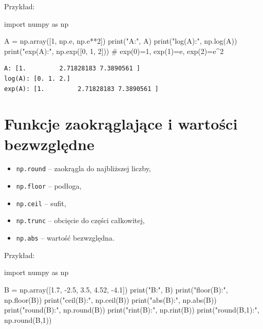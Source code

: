 \documentclass[
  polish,
  letterpaper,
  DIV=11,
  numbers=noendperiod]{scrreprt}
\newenvironment{Shaded}{\begin{snugshade}}{\end{snugshade}}
\newcommand{\BuiltInTok}[1]{\textcolor[rgb]{0.00,0.23,0.31}{#1}}
\newcommand{\CommentTok}[1]{\textcolor[rgb]{0.37,0.37,0.37}{#1}}
\newcommand{\DecValTok}[1]{\textcolor[rgb]{0.68,0.00,0.00}{#1}}
\newcommand{\FloatTok}[1]{\textcolor[rgb]{0.68,0.00,0.00}{#1}}
\newcommand{\ImportTok}[1]{\textcolor[rgb]{0.00,0.46,0.62}{#1}}
\newcommand{\NormalTok}[1]{\textcolor[rgb]{0.00,0.23,0.31}{#1}}
\newcommand{\OperatorTok}[1]{\textcolor[rgb]{0.37,0.37,0.37}{#1}}
\newcommand{\StringTok}[1]{\textcolor[rgb]{0.13,0.47,0.30}{#1}}
\providecommand{\tightlist}{%
  \setlength{\itemsep}{0pt}\setlength{\parskip}{0pt}}
\begin{document}
Przykład:

\begin{Shaded}
\begin{Highlighting}[]
\ImportTok{import}\NormalTok{ numpy }\ImportTok{as}\NormalTok{ np}

\NormalTok{A }\OperatorTok{=}\NormalTok{ np.array([}\DecValTok{1}\NormalTok{, np.e, np.e}\OperatorTok{**}\DecValTok{2}\NormalTok{])}
\BuiltInTok{print}\NormalTok{(}\StringTok{"A:"}\NormalTok{, A)}
\BuiltInTok{print}\NormalTok{(}\StringTok{"log(A):"}\NormalTok{, np.log(A))}
\BuiltInTok{print}\NormalTok{(}\StringTok{"exp(A):"}\NormalTok{, np.exp([}\DecValTok{0}\NormalTok{, }\DecValTok{1}\NormalTok{, }\DecValTok{2}\NormalTok{]))  }\CommentTok{\# exp(0)=1, exp(1)=e, exp(2)=e\^{}2}
\end{Highlighting}
\end{Shaded}

\begin{verbatim}
A: [1.         2.71828183 7.3890561 ]
log(A): [0. 1. 2.]
exp(A): [1.         2.71828183 7.3890561 ]
\end{verbatim}

\section{Funkcje zaokrąglające i wartości
bezwzględne}\label{funkcje-zaokrux105glajux105ce-i-wartoux15bci-bezwzglux119dne}

\begin{itemize}
\tightlist
\item
  \texttt{np.round} -- zaokrągla do najbliższej liczby,
\item
  \texttt{np.floor} -- podłoga,
\item
  \texttt{np.ceil} -- sufit,
\item
  \texttt{np.trunc} -- obcięcie do części całkowitej,
\item
  \texttt{np.abs} -- wartość bezwzględna.
\end{itemize}

Przykład:

\begin{Shaded}
\begin{Highlighting}[]
\ImportTok{import}\NormalTok{ numpy }\ImportTok{as}\NormalTok{ np}

\NormalTok{B }\OperatorTok{=}\NormalTok{ np.array([}\FloatTok{1.7}\NormalTok{, }\OperatorTok{{-}}\FloatTok{2.5}\NormalTok{, }\FloatTok{3.5}\NormalTok{, }\FloatTok{4.52}\NormalTok{, }\OperatorTok{{-}}\FloatTok{4.1}\NormalTok{])}
\BuiltInTok{print}\NormalTok{(}\StringTok{"B:"}\NormalTok{, B)}
\BuiltInTok{print}\NormalTok{(}\StringTok{"floor(B):"}\NormalTok{, np.floor(B))}
\BuiltInTok{print}\NormalTok{(}\StringTok{"ceil(B):"}\NormalTok{, np.ceil(B))}
\BuiltInTok{print}\NormalTok{(}\StringTok{"abs(B):"}\NormalTok{, np.}\BuiltInTok{abs}\NormalTok{(B))}
\BuiltInTok{print}\NormalTok{(}\StringTok{"round(B):"}\NormalTok{, np.}\BuiltInTok{round}\NormalTok{(B))}
\BuiltInTok{print}\NormalTok{(}\StringTok{"rint(B):"}\NormalTok{, np.rint(B))}
\BuiltInTok{print}\NormalTok{(}\StringTok{"round(B,1):"}\NormalTok{, np.}\BuiltInTok{round}\NormalTok{(B,}\DecValTok{1}\NormalTok{))}
\end{Highlighting}
\end{Shaded}
\end{document}
